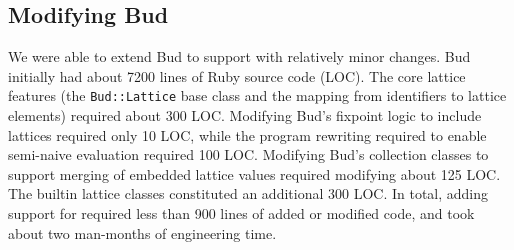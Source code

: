 \subsection{Modifying Bud}
We were able to extend Bud to support \lang with relatively minor changes. Bud
initially had about 7200 lines of Ruby source code (LOC). The core lattice
features (the \texttt{Bud::Lattice} base class and the mapping from identifiers
to lattice elements) required about 300 LOC. Modifying Bud's fixpoint logic to
include lattices required only 10 LOC, while the program rewriting required to
enable semi-naive evaluation required 100 LOC. Modifying Bud's collection
classes to support merging of embedded lattice values required modifying about
125 LOC. The builtin lattice classes constituted an additional 300 LOC. In
total, adding support for \lang required less than 900 lines of added or
modified code, and took about two man-months of engineering time.%
